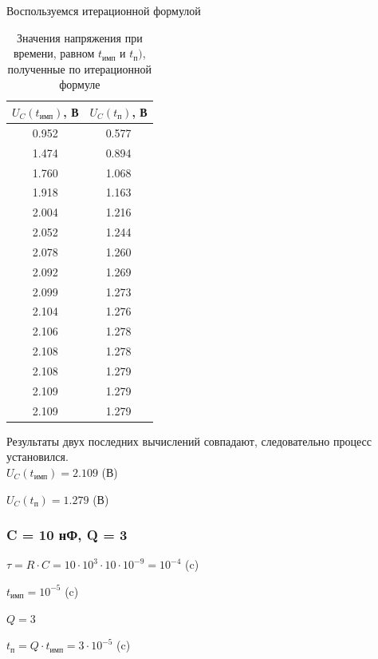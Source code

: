 	Воспользуемся итерационной формулой
\begin{table}[H]

	\begin{center}
	\caption{Значения напряжения при времени, равном $t_\text{имп}$ и $t_\text{п})$, полученные по итерационной формуле}
	\begin{tabular}{|c|c|}
		\hline 
		$U_C(t_\text{имп})$, В & $U_C(t_\text{п})$, В \\ 
		\hline 
		0.952 & 0.577 \\ 
		\hline 
		1.474 & 0.894 \\ 
		\hline 
		1.760 & 1.068 \\ 
		\hline 
		1.918 & 1.163 \\ 
		\hline 
		2.004 & 1.216 \\ 
		\hline 
		2.052 & 1.244 \\ 
		\hline 
		2.078 & 1.260 \\ 
		\hline 
		2.092 & 1.269 \\ 
		\hline 
		2.099 & 1.273 \\ 
		\hline 
		2.104 & 1.276 \\ 
		\hline 
		2.106 & 1.278 \\ 
		\hline 
		2.108 & 1.278 \\ 
		\hline 
		2.108 & 1.279 \\ 
		\hline 
		2.109 & 1.279 \\ 
		\hline 
		2.109 & 1.279 \\ 
		\hline 
		\end{tabular} 	
		
	\end{center}
\end{table}
	Результаты двух последних вычислений совпадают, следовательно процесс установился.\\
	
	$U_C(t_\text{имп}) = 2.109$ (В)
	
	$U_C(t_\text{п}) = 1.279$ (В)	
		

\subsubsection{C = 10 нФ, Q = 3}

$\tau = R \cdot C = 10 \cdot 10^3 \cdot 10 \cdot 10^{-9} = 10^{-4}$ (c)
		
		$t_\text{имп} = 10^{-5}$ (c)
		
		$Q = 3$
		
		$t_\text{п} = Q \cdot t_\text{имп} = 3 \cdot 10^{-5}$ (c)
		
